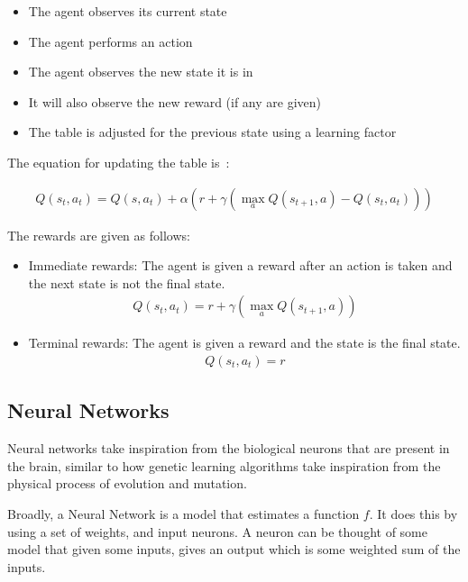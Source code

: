 \begin{itemize}
    \item The agent observes its current state
    \item The agent performs an action
    \item The agent observes the new state it is in
    \item It will also observe the new reward (if any are given)
    \item The table is adjusted for the previous state using a learning factor
\end{itemize}

The equation for updating the table is~\cite{watkins1992q}:

\begin{align}
    Q(s_t,a_t) = Q(s,a_t) + \alpha (r + \gamma (\max_a Q(s_{t+1}, a) - Q(s_t,a_t)))
\end{align}

The rewards are given as follows:

\begin{itemize}
    \item Immediate rewards: The agent is given a reward after an action is
        taken and the next state is not the final state.
        \begin{align}
            Q(s_t,a_t) = r + \gamma (\max_a Q(s_{t+1}, a))
        \end{align}
    \item Terminal rewards: The agent is given a reward and the state is the
        final state.
        \begin{align}
            Q(s_t,a_t) = r
        \end{align}
\end{itemize}

\subsection{Neural Networks}

Neural networks take inspiration from the biological neurons that
are present in the brain, similar to how genetic learning
algorithms take inspiration from the physical process of evolution
and mutation\cite{goldberg2006genetic}.

Broadly, a Neural Network is a model that estimates a function $f$.
It does this by using a set of weights, and input neurons. A neuron
can be thought of some model that given some inputs, gives
an output which is some weighted sum of the inputs.

